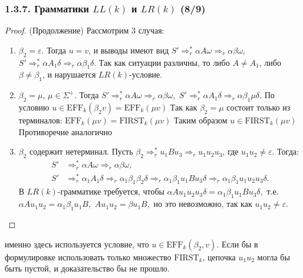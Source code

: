 \begin{frame}
\frametitle{1.3.7. Грамматики $LL(k)$ и $LR(k)$ (8/9)}
\begin{proof} (Продолжение)
Рассмотрим 3 случая:
\begin{enumerate}
    \item $\beta_2 = \varepsilon$.
    Тогда $u=v$, и выводы имеют вид
    \(
    S' \Rightarrow_r^* \alpha A \omega \Rightarrow_r \alpha \beta \omega,\)
    \(S' \Rightarrow_r^* \alpha A_1 \delta \Rightarrow_r \alpha \beta_1 \delta.
    \)
    Так как ситуации различны, то либо $A \ne A_1$, либо $\beta \ne \beta_1$,
    и нарушается $LR(k)$-условие.
\item $\beta_2 = \mu$, $\mu \in \Sigma^+$.
Тогда \(
S' \Rightarrow_r^* \alpha A \omega \Rightarrow_r \alpha \beta \omega,\)
\(S' \Rightarrow_r^* \alpha A_1 \delta \Rightarrow_r \alpha \beta_1 \mu \delta.
\)
По условию $u \in \mathrm{EFF}_k(\beta_2 v) = \mathrm{EFF}_k(\mu v)$
Так как $\beta_2 = \mu$ состоит только из терминалов:
$\mathrm{EFF}_k(\mu v) = \mathrm{FIRST}_k(\mu v)$
Таким образом  $u \in \mathrm{FIRST}_k(\mu v)$
Противоречие аналогично
\item $\beta_2$ содержит нетерминал.
Пусть $\beta_2 \Rightarrow_r^* u_1 B u_3 \Rightarrow_r u_1 u_2 u_3$, где $u_1 u_2 \ne \varepsilon$.
Тогда:
\[
\begin{aligned}
S' &\Rightarrow_r^* \alpha A \omega \Rightarrow_r \alpha \beta \omega,\\
S' &\Rightarrow_r^* \alpha_1 A_1 \delta \Rightarrow_r \alpha_1 \beta_1 \beta_2 \delta 
     \Rightarrow_r \alpha_1 \beta_1 u_1 B u_3 \delta \Rightarrow_r \alpha_1 \beta_1 u_1 u_2 u_3 \delta.
\end{aligned}
\]
В $LR(k)$-грамматике требуется, чтобы
\(
\alpha A u_1 u_2 u_3 \delta = \alpha_1 \beta_1 u_1 B u_3 \delta,
\) т.е. \\
\(
\alpha A u_1 u_2 = \alpha_1 \beta_1 u_1 B,
\)
\(
A u_1 u_2 = \beta u_1 B,
\)
но это невозможно, так как $u_1 u_2 \ne \varepsilon$.
\end{enumerate}

\vspace{-12pt}
\end{proof}

\begin{remark}
именно здесь используется условие, что \(u \in \mathrm{EFF}_k(\beta_2, v).\)
Если бы в формулировке использовать только множество $\mathrm{FIRST}_k$,
цепочка $u_1 u_2$ могла бы быть пустой, и доказательство бы не прошло.
\end{remark}

\end{frame}

